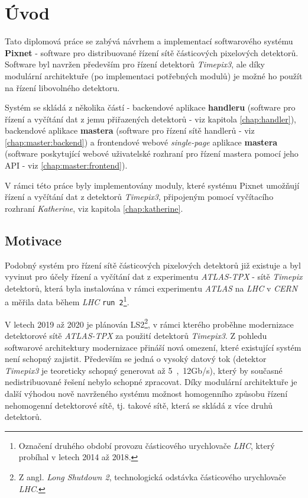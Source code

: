 

\chapter{Úvod}\label{chap01} 
Tato diplomová práce se zabývá návrhem a implementací softwarového systému \textbf{Pixnet} - software pro distribuované řízení sítě částicových pixelových detektorů. Software byl navržen především pro řízení detektorů \textit{Timepix3}, ale díky modulární architektuře (po implementaci potřebných modulů) je možné ho použít na řízení libovolného detektoru.

Systém se skládá z několika částí - backendové aplikace \textbf{handleru} (software pro řízení a vyčítání dat z jemu přiřazených detektorů - viz kapitola \ref{chap:handler}), backendové aplikace \textbf{mastera} (software pro řízení sítě handlerů - viz \ref{chap:master:backend}) a frontendové webové \textit{single-page} aplikace \textbf{mastera} (software poskytující webové uživatelské rozhraní pro řízení mastera pomocí jeho API - viz \ref{chap:master:frontend}).

V rámci této práce byly implementovány moduly, které systému Pixnet umožňují řízení a vyčítání dat z detektorů \textit{Timepix3}, připojeným pomocí vyčítacího rozhraní \textit{Katherine}, viz kapitola \ref{chap:katherine}.

\section{Motivace}
Podobný systém pro řízení sítě částicových pixelových detektorů již existuje \cite{atlastpx_sw,BegeraBcThesis2016} a byl vyvinut pro účely řízení a vyčítání dat z experimentu \textit{ATLAS-TPX} - sítě \textit{Timepix} detektorů, která byla instalována v rámci experimentu \textit{ATLAS} na \textit{LHC} v \textit{CERN} a měřila data během \textit{LHC} \texttt{run 2}\footnote{Označení druhého období provozu částicového urychlovače \textit{LHC}, který probíhal v letech 2014 až 2018.}. 

V letech 2019 až 2020 je plánován LS2\footnote{Z angl. \textit{Long Shutdown 2}, technologická odstávka částicového urychlovače \textit{LHC}.}, v rámci kterého proběhne modernizace detektorové sítě \textit{ATLAS-TPX} za použití detektorů \textit{Timepix3}. Z pohledu softwarové architektury modernizace přináší nová omezení, které existující systém není schopný zajistit. Především se jedná o vysoký datový tok (detektor \textit{Timepix3} je teoreticky schopný generovat až \unit{5,12}{Gb/s}), který by současné nedistribuované řešení nebylo schopné zpracovat. Díky modulární architektuře je další výhodou nově navrženého systému možnost homogenního způsobu řízení nehomogenní detektorové sítě, tj. takové sítě, která se skládá z více druhů detektorů.

